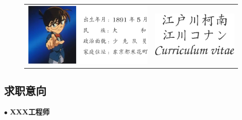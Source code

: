 \documentclass[CJKutf8]{tccv}
\begin{document}
\begin{CJK*}{UTF8}{gbsn}

  \begin{figure}
    \begin{tabular}{lr}
      \includegraphics[scale=1]{photo.eps} \qquad \qquad \qquad \qquad & 
      \qquad  \includegraphics[scale=1]{name.eps}
    \end{tabular}
  \end{figure} 
  
  \begin{CJK*}{UTF8}{gkai}
    \section{\LARGE \textbf{求职意向}}
  \end{CJK*}
  \begin{factlist}
  \item{$\bullet$}
    {\textbf{XXX工程师}}
  \end{factlist}
\medskip  %

  \begin{CJK*}{UTF8}{gkai}

\end{CJK*}
\end{CJK*}
\end{document}
